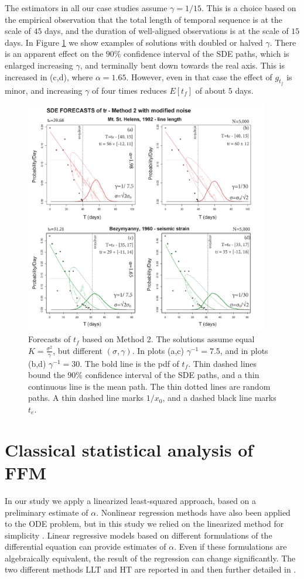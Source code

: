 \documentclass{article}
\begin{document}
The estimators in all our case studies assume $\gamma=1/15$.  This is a choice based on the empirical observation that the total length of temporal sequence is at the scale of $45$ days, and the duration of well-aligned observations is at the scale of $15$ days. In Figure \ref{Fig12} we show examples of solutions with doubled or halved $\gamma$. There is an apparent effect on the $90\%$ confidence interval of the SDE paths, which is enlarged increasing $\gamma$, and terminally bent down towards the real axis. This is increased in (c,d), where $\alpha=1.65$. However, even in that case the effect of $g_{t_f}$ is minor, and increasing $\gamma$ of four times reduces $E[t_f]$ of about $5$ days.
\begin{figure}[H]
\centering
\includegraphics[width=0.95\textwidth]{Fig12_plus.png}
\caption{Forecasts of $t_f$ based on Method 2. The solutions assume equal $K=\frac{\sigma^2}{\gamma}$, but different $(\sigma, \gamma)$. In plots (a,c) $\gamma^{-1}=7.5$, and in plots (b,d) $\gamma^{-1}=30$. The bold line is the pdf of $t_f$. Thin dashed lines bound the $90\%$ confidence interval of the SDE paths, and a thin continuous line is the mean path. The thin dotted lines are random paths. A thin dashed line marks $1/x_0$, and a dashed black line marks $t_e$.}
\label{Fig12}
\end{figure}

\section{Classical statistical analysis of FFM}\label{A-1}
In our study we apply a linearized least-squared approach, based on a preliminary estimate of $\alpha$. Nonlinear regression methods have also been applied to the ODE problem, but in this study we relied on the linearized method for simplicity \citep{Bell2011}. Linear regressive models based on different formulations of the differential equation can provide estimates of $\alpha$. Even if these formulations are algebraically equivalent, the result of the regression can change significantly. The two different methods LLT and HT are reported in \cite{Voight1988} and then further detailed in \cite{Cornelius1995}.
\end{document}
